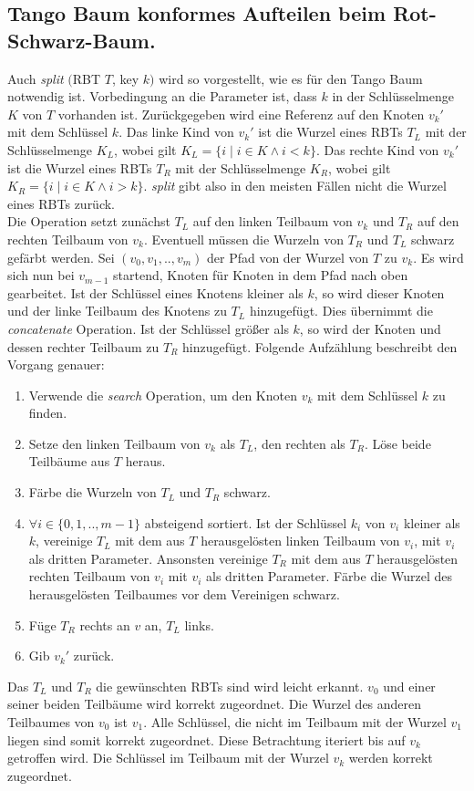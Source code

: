 \documentclass[a4paper,12pt]{article}
\begin{document}
\subsection{Tango Baum konformes Aufteilen beim Rot-Schwarz-Baum.}
Auch \textit{split} $($RBT $T$, key $k)$ wird so vorgestellt, wie es für den Tango Baum notwendig ist. Vorbedingung an die Parameter ist, dass $k$ in der Schlüsselmenge $K$ von $T$ vorhanden ist. Zurückgegeben wird eine Referenz auf den Knoten ${v_k}'$ mit dem Schlüssel $k$. Das linke Kind von ${v_k}'$ ist die Wurzel eines RBTs $T_L$ mit der Schlüsselmenge $K_L$, wobei gilt ${K_L=\{i \mid  i\in K \land i <k\}}$. Das rechte Kind von ${v_k}'$ ist die Wurzel eines RBTs $T_R$ mit der Schlüsselmenge $K_R$, wobei gilt ${K_R = \{i \mid i\in K \land i > k\}}$. \textit{split} gibt also in den meisten Fällen nicht die Wurzel eines RBTs zurück.\\ Die Operation setzt zunächst $T_L$ auf den linken Teilbaum von $v_k$ und $T_R$ auf den rechten Teilbaum von $v_k$. Eventuell müssen die Wurzeln von $T_R$ und $T_L$ schwarz gefärbt werden. Sei $(v_0,v_1,..,v_m)$  der Pfad von der Wurzel von $T$ zu $v_k$. Es wird sich nun bei $v_{m-1}$ startend, Knoten für Knoten in dem Pfad nach oben gearbeitet. Ist der Schlüssel eines Knotens kleiner als $k$, so wird dieser Knoten und der linke Teilbaum des Knotens zu $T_L$ hinzugefügt. Dies übernimmt die \textit{concatenate} Operation. Ist der Schlüssel größer als $k$, so wird der Knoten und dessen rechter Teilbaum  zu $T_R$ hinzugefügt. Folgende Aufzählung beschreibt den Vorgang genauer:

\begin{enumerate}
	\item Verwende die \textit{search} Operation, um den Knoten $v_k$ mit dem Schlüssel $k$ zu finden.
	\item Setze den linken Teilbaum von $v_k$ als $T_L$, den rechten als $T_R$. Löse beide Teilbäume aus $T$ heraus.
	\item Färbe die Wurzeln von $T_L$ und $T_R$ schwarz.
	\item $\forall i \in \{0,1,..,m-1\}$ absteigend sortiert. Ist der Schlüssel $k_i$ von $v_i$ kleiner als $k$, vereinige $T_L$ mit dem aus $T$ herausgelösten linken Teilbaum von $v_i$, mit  $v_i$ als dritten Parameter. Ansonsten vereinige $T_R$ mit dem aus $T$ herausgelösten rechten Teilbaum von $v_i$ mit  $v_i$ als dritten Parameter. Färbe die Wurzel des herausgelösten Teilbaumes vor dem Vereinigen schwarz. 
	\item Füge $T_R$ rechts an $v$ an, $T_L$ links.
	\item Gib ${v_k}'$ zurück.
\end{enumerate}   
Das $T_L$ und $T_R$ die gewünschten RBTs sind wird leicht erkannt. $v_0$ und einer seiner beiden Teilbäume wird korrekt zugeordnet. Die Wurzel des anderen Teilbaumes von $v_0$ ist $v_{1}$. Alle Schlüssel, die nicht im Teilbaum mit der Wurzel $v_{1}$ liegen sind somit korrekt zugeordnet. Diese Betrachtung iteriert bis auf $v_k$ getroffen wird. Die Schlüssel im Teilbaum mit der Wurzel $v_k$ werden korrekt zugeordnet. 
\end{document}
